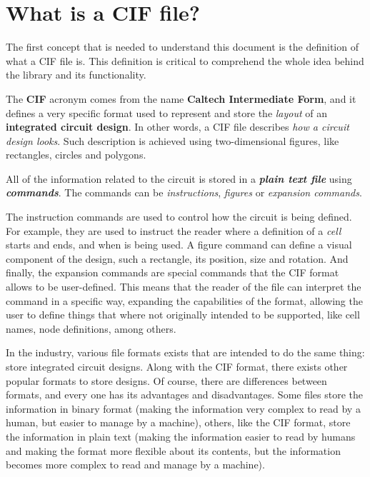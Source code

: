 \documentclass[11pt,twoside,openany,x11names,svgnames]{memoir}
\begin{document}
\section{What is a CIF file?}\label{What-is-a-CIF-file}

The first concept that is needed to understand this document is the definition of what a CIF file is. This definition is critical to comprehend the whole idea behind the library and its functionality.

The \textbf{CIF} acronym comes from the name \textbf{Caltech Intermediate Form}, and it defines a very specific format used to represent and store the \textit{layout} of an \textbf{integrated circuit design}. In other words, a CIF file describes \textit{how a circuit design looks}. Such description is achieved using two-dimensional figures, like rectangles, circles and polygons.

All of the information related to the circuit is stored in a \textit{\textbf{plain text file}} using \textit{\textbf{commands}}. The commands can be \textit{instructions}, \textit{figures} or \textit{expansion commands}.

The instruction commands are used to control how the circuit is being defined. For example, they are used to instruct the reader where a definition of a \textit{cell} starts and ends, and when is being used. A figure command can define a visual component of the design, such a rectangle, its position, size and rotation. And finally, the expansion commands are special commands that the CIF format allows to be user-defined. This means that the reader of the file can interpret the command in a specific way, expanding the capabilities of the format, allowing the user to define things that where not originally intended to be supported, like cell names, node definitions, among others.

In the industry, various file formats exists that are intended to do the same thing: store integrated circuit designs. Along with the CIF format, there exists other popular formats to store designs. Of course, there are differences between formats, and every one has its advantages and disadvantages. Some files store the information in binary format (making the information very complex to read by a human, but easier to manage by a machine), others, like the CIF format, store the information in plain text (making the information easier to read by humans and making the format more flexible about its contents, but the information becomes more complex to read and manage by a machine).
\end{document}
